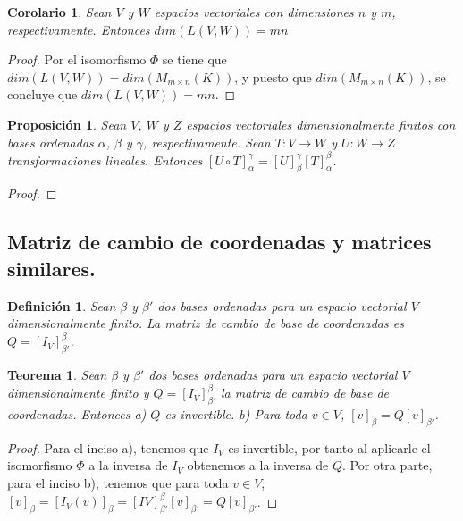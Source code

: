 \documentclass{book}
\newtheorem{theorem}{Teorema}
\newtheorem{proposition}{Proposición}
\newtheorem{definition}{Definición}
\newtheorem{corollary}{Corolario}
\begin{document}
\begin{corollary}
Sean $V$ y $W$ espacios vectoriales con dimensiones $n$ y $m$, respectivamente. Entonces $dim(L(V,W))=mn$ 
\end{corollary}

\begin{proof}
Por el isomorfismo $\Phi$ se tiene que $dim(L(V,W))=dim(M_{m\times n}(K))$, y puesto que $dim(M_{m\times n}(K))$, se concluye que $dim(L(V,W))=mn$.
\end{proof}

\begin{proposition}
Sean $V$, $W$ y $Z$ espacios vectoriales dimensionalmente finitos con bases ordenadas $\alpha$, $\beta$ y $\gamma$, respectivamente. Sean $T:V \rightarrow W$ y $U:W \rightarrow Z$ transformaciones lineales. Entonces $[U\circ T]_{\alpha} ^{\gamma}=[U]_{\beta} ^{\gamma} [T]_{\alpha} ^{\beta}$.
\end{proposition}

\begin{proof}

\end{proof}

\subsection{Matriz de cambio de coordenadas y matrices similares.}
\begin{definition}
Sean $\beta$ y $\beta '$ dos bases ordenadas para un espacio vectorial $V$ dimensionalmente finito. La matriz de cambio de base de coordenadas es $Q=[I_V]_{\beta '} ^{\beta}$.
\end{definition}


\begin{theorem}
Sean $\beta$ y $\beta '$ dos bases ordenadas para un espacio vectorial $V$ dimensionalmente finito y $Q=[I_V]_{\beta '} ^{\beta}$ la matriz de cambio de base de coordenadas. Entonces \newline
a) $Q$ es invertible. \newline
b) Para toda $v\in V$, $[v]_{\beta}=Q[v]_{\beta'}$.
\end{theorem}

\begin{proof} %
Para el inciso a), tenemos que $I_V$ es invertible, por tanto al aplicarle el isomorfismo $\Phi$ a la inversa de $I_V$ obtenemos a la inversa de $Q$. Por otra parte, para el inciso b), tenemos que para toda $v\in V$, $[v]_{\beta}=[I_{V}(v)]_{\beta}=[I{V}]_{\beta '} ^{\beta} [v]_{\beta'}=Q[v]_{\beta'}$.
\end{proof}
\end{document}
